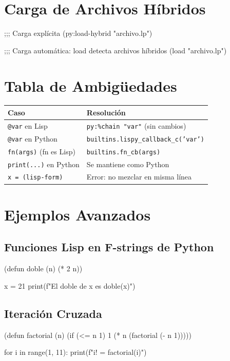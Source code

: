 \section{Carga de Archivos Híbridos}

\begin{lispcode}
;;; Carga explícita
(py:load-hybrid "archivo.lp")

;;; Carga automática: load detecta archivos híbridos
(load "archivo.lp")
\end{lispcode}

\section{Tabla de Ambigüedades}

\begin{center}
\begin{longtable}{ll}
\toprule
\textbf{Caso} & \textbf{Resolución} \\
\midrule
\texttt{@var} en Lisp & \texttt{py:\%chain "var"} (sin cambios) \\
\texttt{@var} en Python & \texttt{builtins.lispy\_callback\_c('var')} \\
\texttt{fn(args)} (fn es Lisp) & \texttt{builtins.fn\_cb(args)} \\
\texttt{print(...)} en Python & Se mantiene como Python \\
\texttt{x = (lisp-form)} & Error: no mezclar en misma línea \\
\bottomrule
\end{longtable}
\end{center}

\section{Ejemplos Avanzados}

\subsection{Funciones Lisp en F-strings de Python}
\begin{lispcode}
(defun doble (n) (* 2 n))

x = 21
print(f"El doble de {x} es {doble(x)}")
\end{lispcode}

\subsection{Iteración Cruzada}
\begin{lispcode}
(defun factorial (n)
  (if (<= n 1) 1 (* n (factorial (- n 1)))))

for i in range(1, 11):
    print(f"{i}! = {factorial(i)}")
\end{lispcode}


